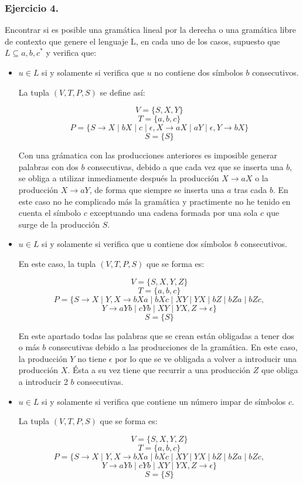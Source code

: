 \documentclass[11pt,a4paper]{article}
\begin{document}
\subsubsection{Ejercicio 4.} Encontrar si es posible una gramática lineal por la derecha o una gramática libre de contexto que genere el lenguaje L, en cada uno de los casos, supuesto que $L\subseteq {a,b,c}^{*}$ y verifica que:
	\begin{itemize}
	\item $u \in L$ si y solamente si verifica que $u$ no contiene dos símbolos $b$ consecutivos.
	
	La tupla $(V,T,P,S)$ se define así:
	
	\[V=\{S,X,Y\}\]
	\[T=\{a,b,c\}\]
	\[P=\{S\rightarrow X\mid bX\mid c\mid \epsilon,X\rightarrow aX\mid aY\mid \epsilon,Y\rightarrow bX\}\]
	\[S=\{S\}\]
	
	Con una grámatica con las producciones anteriores es imposible generar palabras con dos $b$ consecutivas, debido a que cada vez que se inserta una $b$, se obliga a utilizar inmediamente después la producción $X\rightarrow aX$ o la producción $X\rightarrow aY$, de forma que siempre se inserta una $a$ tras cada $b$. En este caso no he complicado más la gramática y practimente no he tenido en cuenta el símbolo $c$ exceptuando una cadena formada por una sola $c$ que surge de la producción $S$.
	
	\item $u \in L$ si y solamente si verifica que u contiene dos símbolos $b$ consecutivos.
	
	En este caso, la tupla $(V,T,P,S)$ que se forma es:
	
	\[V=\{S,X,Y,Z\}\]
	\[T=\{a,b,c\}\]
	\[P=\{S\rightarrow X\mid Y,X\rightarrow bXa\mid bXc\mid XY\mid YX\mid bZ\mid bZa\mid bZc,\]\[Y\rightarrow aYb\mid cYb\mid XY\mid YX,Z\rightarrow \epsilon\}\]
	\[S=\{S\}\]
	
	En este apartado todas las palabras que se crean están obligadas a tener dos o más $b$ consecutivas debido a las producciones de la gramática. En este caso, la producción $Y$ no tiene $\epsilon$ por lo que se ve obligada a volver a introducir una producción $X$. Ésta a su vez tiene que recurrir a una producción $Z$ que obliga a introducir 2 $b$ consecutivas.
	
	\item $u \in L$ si y solamente si verifica que contiene un número impar de símbolos $c$.
	
	La tupla $(V,T,P,S)$ que se forma es:
	
	\[V=\{S,X,Y,Z\}\]
	\[T=\{a,b,c\}\]
	\[P=\{S\rightarrow X\mid Y,X\rightarrow bXa\mid bXc\mid XY\mid YX\mid bZ\mid bZa\mid bZc,\]\[Y\rightarrow aYb\mid cYb\mid XY\mid YX,Z\rightarrow \epsilon\}\]
	\[S=\{S\}\]
	
	\end{itemize}
\end{document}
